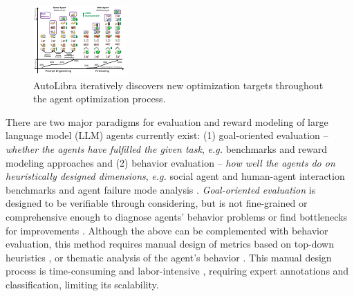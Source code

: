 \begin{figure}[!b]
    \centering
    \includegraphics[width=\textwidth]{figs/autolibra-teaser.pdf}
    \vspace{-10pt}
    \caption{AutoLibra iteratively discovers new optimization targets throughout the agent optimization process. }
    \label{fig:autolibra-training}
\end{figure}

   
There are two major paradigms for evaluation and reward modeling of large language model (LLM) agents currently exist: (1) goal-oriented evaluation --
\emph{whether the agents have fulfilled the given task},
\emph{e.g.} benchmarks \citep{zhouwebarena,jimenezswe,chan2024mle,paglieri2024balrog} and reward
modeling approaches \citep{pan2024autonomous,chen2025scaling,choudhury2025process}
and (2) behavior evaluation -- \emph{how well the agents do on heuristically designed dimensions},
\emph{e.g.} social agent and human-agent interaction benchmarks \citep{zhousotopia,shao2024collaborative}
and agent failure mode analysis \citep{pan2025why,zhang2023effects,yang2023behavioral}.
\textit{Goal-oriented evaluation} is designed to be verifiable through considering, but is not fine-grained
or comprehensive enough to diagnose agents' behavior problems or find bottlenecks for improvements \citep{yehudai2025survey}.  
Although the above can be complemented with behavior evaluation, this method requires manual design of metrics based on top-down heuristics
\citep{zhousotopia}, or thematic analysis of the agent's behavior \citep{shao2024collaborative,pan2025why}.
This manual design process is time-consuming and labor-intensive , requiring expert annotations and classification, limiting its scalability. 


